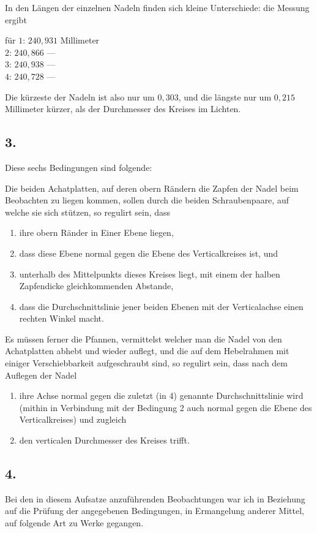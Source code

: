 \documentclass[12pt,a4paper]{article}
\begin{document}
In den Längen der einzelnen Nadeln finden sich kleine Unterschiede: die Messung ergibt
\begin{center}
für $1$: $240{,}931$ Millimeter\\
$2$: $240{,}866$ ---\\
$3$: $240{,}938$ ---\\
$4$: $240{,}728$ ---
\end{center}
Die kürzeste der Nadeln ist also nur um $0{,}303$, und die längste nur um $0{,}215$ Millimeter kürzer, als der Durchmesser des Kreises im Lichten.

\subsection*{3.}
Diese sechs Bedingungen sind folgende:

Die beiden Achatplatten, auf deren obern Rändern die Zapfen der Nadel beim Beobachten zu liegen kommen, sollen durch die beiden Schraubenpaare, auf welche sie sich stützen, so regulirt sein, dass
\begin{enumerate}[label=\arabic*)]
\item ihre obern Ränder in Einer Ebene liegen,
\item dass diese Ebene normal gegen die Ebene des Verticalkreises ist, und
\item unterhalb des Mittelpunkts dieses Kreises liegt, mit einem der halben Zapfendicke gleichkommenden Abstande,
\item dass die Durchschnittslinie jener beiden Ebenen mit der Verticalachse einen rechten Winkel macht.
\end{enumerate}

Es müssen ferner die Pfannen, vermittelst welcher man die Nadel von den Achatplatten abhebt und wieder auflegt, und die auf dem Hebelrahmen mit einiger Verschiebbarkeit aufgeschraubt sind, so regulirt sein, dass nach dem Auflegen der Nadel
\begin{enumerate}[label=\arabic*), resume]
\item ihre Achse normal gegen die zuletzt (in 4) genannte Durchschnittslinie wird (mithin in Verbindung mit der Bedingung 2 auch normal gegen die Ebene des Verticalkreises) und zugleich
\item den verticalen Durchmesser des Kreises trifft.
\end{enumerate}

\subsection*{4.}
Bei den in diesem Aufsatze anzuführenden Beobachtungen war ich in Beziehung auf die Prüfung der angegebenen Bedingungen, in Ermangelung anderer Mittel, auf folgende Art zu Werke gegangen.
\end{document}

